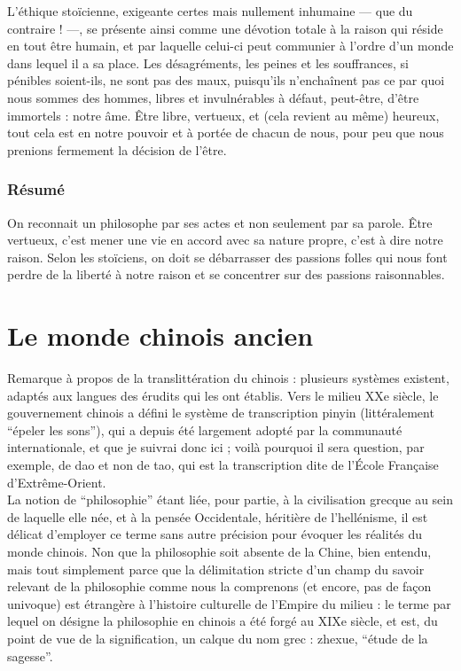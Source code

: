 \documentclass[11pt,a4paper]{article} %
\begin{document}
L'éthique stoïcienne, exigeante certes mais nullement inhumaine --- que du contraire ! ---, se
présente ainsi comme une dévotion totale à la raison qui réside en tout être humain, et par
laquelle celui-ci peut communier à l'ordre d'un monde dans lequel il a sa place. Les désagréments, les peines et les souffrances, si pénibles soient-ils, ne sont pas des maux,
puisqu'ils n'enchaînent pas ce par quoi nous sommes des hommes, libres et invulnérables
à défaut, peut-être, d'être immortels : notre âme. Être libre, vertueux, et (cela revient au
même) heureux, tout cela est en notre pouvoir et à portée de chacun de nous, pour peu que
nous prenions fermement la décision de l'être.

\section{Résumé}
On reconnait un philosophe par ses actes et non seulement par sa parole.
Être vertueux, c'est mener une vie en accord avec sa nature propre, c'est à dire notre raison.
Selon les stoïciens, on doit se débarrasser des passions folles qui nous font perdre de la liberté à notre raison
et se concentrer sur des passions raisonnables.

\part{Le monde chinois ancien}

Remarque à propos de la translittération du chinois : plusieurs systèmes existent, adaptés
aux langues des érudits qui les ont établis.
Vers le milieu XXe siècle, le gouvernement
chinois a défini le système de transcription pinyin (littéralement ``épeler les sons''), qui a
depuis été largement adopté par la communauté internationale, et que je suivrai donc ici ;
voilà pourquoi il sera question, par exemple, de dao et non de tao, qui est la transcription
dite de l'École Française d'Extrême-Orient.\\

La notion de ``philosophie'' étant liée, pour partie, à la civilisation grecque au sein de
laquelle elle née, et à la pensée Occidentale, héritière de l'hellénisme, il est délicat
d'employer ce terme sans autre précision pour évoquer les réalités du monde chinois.
Non
que la philosophie soit absente de la Chine, bien entendu, mais tout simplement parce que
la délimitation stricte d'un champ du savoir relevant de la philosophie comme nous la
comprenons (et encore, pas de façon univoque) est étrangère à l'histoire culturelle de
l'Empire du milieu : le terme par lequel on désigne la philosophie en chinois a été forgé
au XIXe siècle, et est, du point de vue de la signification, un calque du nom grec : zhexue,
``étude de la sagesse''.
\end{document}
